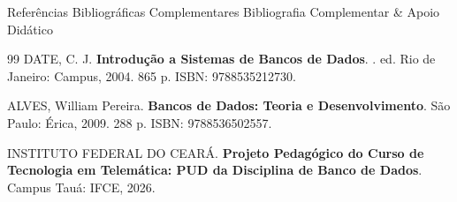 \begin{frame}{Referências Bibliográficas Complementares}
  \alert{Bibliografia Complementar \& Apoio Didático}\par
  \vspace{0.2cm}
  \begin{thebibliography}{99}
    \footnotesize
    \setlength{\itemsep}{2.5mm}
      DATE, C. J.
      \newblock \textbf{Introdução a Sistemas de Bancos de Dados}.
      . ed. Rio de Janeiro: Campus, 2004. 865 p. ISBN: 9788535212730.

      ALVES, William Pereira.
      \newblock \textbf{Bancos de Dados: Teoria e Desenvolvimento}.
      \newblock São Paulo: Érica, 2009. 288 p. ISBN: 9788536502557.

      INSTITUTO FEDERAL DO CEARÁ.
      \newblock \textbf{Projeto Pedagógico do Curso de Tecnologia em Telemática: PUD da Disciplina de Banco de Dados}.
      \newblock Campus Tauá: IFCE, 2026.
  \end{thebibliography}
\end{frame}
